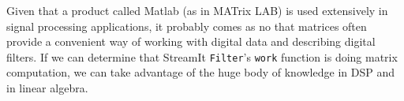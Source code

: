 Given that a product called Matlab (as in  MATrix LAB) is used extensively
in signal processing applications, it probably comes as no  that 
matrices often provide a convenient way of working with
digital data and describing digital filters. If we can determine that StreamIt {\tt Filter}'s
{\tt work} function is doing matrix computation, we can take advantage of the huge body
of knowledge in DSP and in linear algebra.
